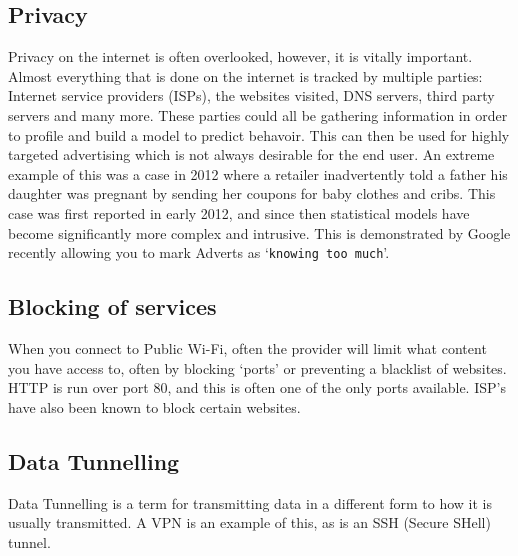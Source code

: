 \subsection{Privacy}
Privacy on the internet is often overlooked, however, it is vitally important\cite{privacyrulez}. Almost everything that is done on the internet is tracked by multiple parties: Internet service providers (ISPs), the websites visited, DNS servers, third party servers and many more. These parties could all be gathering information in order to profile and build a model to predict behavoir. This can then be used for highly targeted advertising which is not always desirable for the end user. An extreme example of this was a case in 2012 where a retailer inadvertently told a father his daughter was pregnant by sending her coupons for baby clothes and cribs.\cite{babyshower}
This case was first reported in early 2012, and since then statistical models have become significantly more complex and intrusive. This is demonstrated by Google recently allowing you to mark Adverts as `\texttt{knowing too much}'\cite{googlearewatching}.

\subsection{Blocking of services}
When you connect to Public Wi-Fi, often the provider will limit what content you have access to, often by blocking `ports' or preventing a blacklist of websites.\\
HTTP is run over port 80, and this is often one of the only ports available. ISP's have also been known to block certain websites.

\subsection{Data Tunnelling}
Data Tunnelling is a term for transmitting data in a different form to how it is usually transmitted. A VPN is an example of this, as is an SSH (Secure SHell) tunnel.

